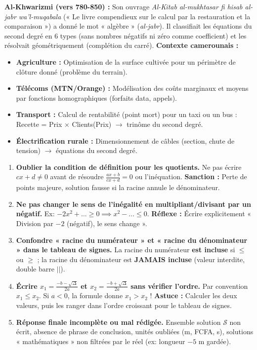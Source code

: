 \documentclass[11pt]{article}
\begin{document}
\begin{savaistu}
    \textbf{Al-Khwarizmi (vers 780-850) :} Son ouvrage \emph{Al-Kitab al-mukhtasar fi hisab al-jabr wa'l-muqabala} (« Le livre compendieux sur le calcul par la restauration et la comparaison ») a donné le mot « algèbre » (\emph{al-jabr}). Il classifiait les équations du second degré en 6 types (sans nombres négatifs ni zéro comme coefficient) et les résolvait géométriquement (complétion du carré).
    \textbf{Contexte camerounais :}
    \begin{itemize}
        \item \textbf{Agriculture :} Optimisation de la surface cultivée pour un périmètre de clôture donné (problème du terrain).
        \item \textbf{Télécoms (MTN/Orange) :} Modélisation des coûts marginaux et moyens par fonctions homographiques (forfaits data, appels).
        \item \textbf{Transport :} Calcul de rentabilité (point mort) pour un taxi ou un bus : Recette = Prix $\times$ Clients(Prix) $\to$ trinôme du second degré.
        \item \textbf{Électrification rurale :} Dimensionnement de câbles (section, chute de tension) $\to$ équations du second degré.
    \end{itemize}
\end{savaistu}

\begin{attention}
    \begin{enumerate}
        \item \textbf{Oublier la condition de définition pour les quotients.} Ne pas écrire $cx+d \neq 0$ avant de résoudre $\frac{ax+b}{cx+d}=0$ ou l'inéquation. \textbf{Sanction :} Perte de points majeure, solution fausse si la racine annule le dénominateur.
        \item \textbf{Ne pas changer le sens de l'inégalité en multipliant/divisant par un négatif.} Ex: $-2x^2+... \ge 0 \implies x^2-... \le 0$. \textbf{Réflexe :} Écrire explicitement « Division par $-2$ (négatif), le sens change ».
        \item \textbf{Confondre « racine du numérateur » et « racine du dénominateur » dans le tableau de signes.} La racine du numérateur \textbf{est incluse} si $\le$ ou $\ge$ ; la racine du dénominateur est \textbf{JAMAIS incluse} (valeur interdite, double barre $||$).
        \item \textbf{Écrire $x_1 = \frac{-b-\sqrt{\Delta}}{2a}$ et $x_2 = \frac{-b+\sqrt{\Delta}}{2a}$ sans vérifier l'ordre.} Par convention $x_1 \le x_2$. Si $a<0$, la formule donne $x_1 > x_2$ ! \textbf{Astuce :} Calculer les deux valeurs, puis les ranger dans l'ordre croissant pour le tableau de signes.
        \item \textbf{Réponse finale incomplète ou mal rédigée.} Ensemble solution $\mathcal{S}$ non écrit, absence de phrase de conclusion, unités oubliées (m, FCFA, s), solutions « mathématiques » non filtrées par le réel (ex: longueur $-5$ m gardée).
    \end{enumerate}
\end{attention}
\end{document}
